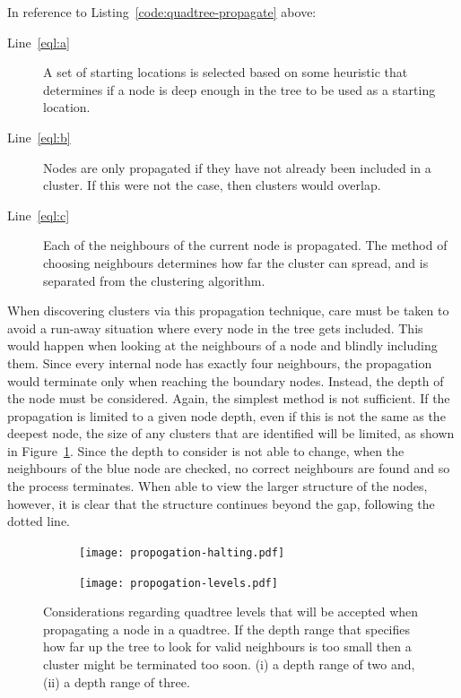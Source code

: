 In reference to Listing~\ref{code:quadtree-propagate} above:
\begin{description}
	\item[Line~\ref{eql:a}] A set of starting locations is selected based on
		some heuristic that determines if a node is deep enough in the tree to
		be used as a starting location.

	\item[Line~\ref{eql:b}] Nodes are only propagated if they have not already
		been included in a cluster. If this were not the case, then clusters
		would overlap.

	\item[Line~\ref{eql:c}] Each of the neighbours of the current node is
		propagated. The method of choosing neighbours determines how far the
		cluster can spread, and is separated from the clustering algorithm.
\end{description}

When discovering clusters via this propagation technique, care must be taken to
avoid a run-away situation where every node in the tree gets included. This
would happen when looking at the neighbours of a node and blindly including
them. Since every internal node has exactly four neighbours, the propagation
would terminate only when reaching the boundary nodes. Instead, the depth of
the node must be considered. Again, the simplest method is not sufficient. If
the propagation is limited to a given node depth, even if this is not the same
as the deepest node, the size of any clusters that are identified will be
limited, as shown in Figure~\ref{fig:propogation-halting}.  Since the depth to
consider is not able to change, when the neighbours of the blue node are
checked, no correct neighbours are found and so the process terminates. When
able to view the larger structure of the nodes, however, it is clear that the
structure continues beyond the gap, following the dotted line.

\begin{figure}[tbh]
	\centering
	\begin{subfigure}[c]{5.2cm}
		\texttt{[image: propogation-halting.pdf]}
		\caption{}\label{fig:propogation-halting}
	\end{subfigure}%
	\quad
	\begin{subfigure}[c]{3.2cm}
		\texttt{[image: propogation-levels.pdf]}
		\caption{}\label{fig:propogation-levels}
	\end{subfigure}

	\caption[Considerations regarding quadtree levels to be accepted.]
		{Considerations regarding quadtree levels that will be accepted
		when propagating a node in a quadtree. 
		If the depth range that specifies how far up the tree to look for valid
		neighbours is too small then a cluster might be terminated too soon.
		(i) a depth range of two and, (ii) a
		depth range of three.}\label{fig:prop-levels-halting}
\end{figure}

